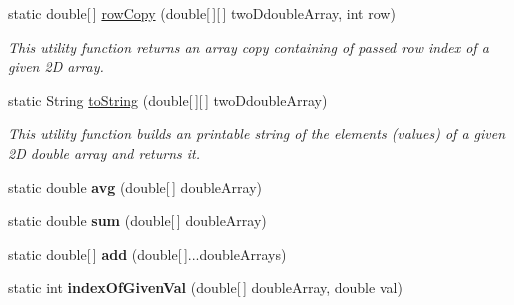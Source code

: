 \begin{DoxyCompactItemize}
\item 
static double\mbox{[}$\,$\mbox{]} \hyperlink{classuk_1_1ac_1_1dmu_1_1iesd_1_1cascade_1_1market_1_1astem_1_1util_1_1_arrays_utils_a480315c19ad8a505db04ab3669ce1bf5}{row\-Copy} (double\mbox{[}$\,$\mbox{]}\mbox{[}$\,$\mbox{]} two\-Ddouble\-Array, int row)
\begin{DoxyCompactList}\small\item\em This utility function returns an array copy containing of passed row index of a given 2\-D array. \end{DoxyCompactList}\item 
static String \hyperlink{classuk_1_1ac_1_1dmu_1_1iesd_1_1cascade_1_1market_1_1astem_1_1util_1_1_arrays_utils_a67288f0d6cd098a38f1744daab66154d}{to\-String} (double\mbox{[}$\,$\mbox{]}\mbox{[}$\,$\mbox{]} two\-Ddouble\-Array)
\begin{DoxyCompactList}\small\item\em This utility function builds an printable string of the elements (values) of a given 2\-D double array and returns it. \end{DoxyCompactList}\item 
\hypertarget{classuk_1_1ac_1_1dmu_1_1iesd_1_1cascade_1_1market_1_1astem_1_1util_1_1_arrays_utils_a69bc19ce3490509cfbdb2d83cf3ab171}{static double {\bfseries avg} (double\mbox{[}$\,$\mbox{]} double\-Array)}\label{classuk_1_1ac_1_1dmu_1_1iesd_1_1cascade_1_1market_1_1astem_1_1util_1_1_arrays_utils_a69bc19ce3490509cfbdb2d83cf3ab171}

\item 
\hypertarget{classuk_1_1ac_1_1dmu_1_1iesd_1_1cascade_1_1market_1_1astem_1_1util_1_1_arrays_utils_abe467158553237b687ac37a0d69dd0dc}{static double {\bfseries sum} (double\mbox{[}$\,$\mbox{]} double\-Array)}\label{classuk_1_1ac_1_1dmu_1_1iesd_1_1cascade_1_1market_1_1astem_1_1util_1_1_arrays_utils_abe467158553237b687ac37a0d69dd0dc}

\item 
\hypertarget{classuk_1_1ac_1_1dmu_1_1iesd_1_1cascade_1_1market_1_1astem_1_1util_1_1_arrays_utils_adf5ba03e298197f1e3aef14b46f24182}{static double\mbox{[}$\,$\mbox{]} {\bfseries add} (double\mbox{[}$\,$\mbox{]}...double\-Arrays)}\label{classuk_1_1ac_1_1dmu_1_1iesd_1_1cascade_1_1market_1_1astem_1_1util_1_1_arrays_utils_adf5ba03e298197f1e3aef14b46f24182}

\item 
\hypertarget{classuk_1_1ac_1_1dmu_1_1iesd_1_1cascade_1_1market_1_1astem_1_1util_1_1_arrays_utils_ab5642aca3df30e791dc2049a92f7aeac}{static int {\bfseries index\-Of\-Given\-Val} (double\mbox{[}$\,$\mbox{]} double\-Array, double val)}\label{classuk_1_1ac_1_1dmu_1_1iesd_1_1cascade_1_1market_1_1astem_1_1util_1_1_arrays_utils_ab5642aca3df30e791dc2049a92f7aeac}

\end{DoxyCompactItemize}


